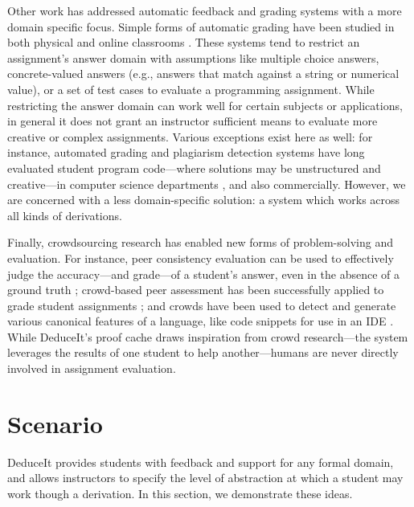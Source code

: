 \documentclass{sigchi}
\begin{document}
Other work has addressed automatic feedback and grading systems with a more domain specific focus. Simple forms of automatic grading have been studied in both physical and online classrooms \cite{auto-grade}. These systems tend to restrict an assignment's answer domain with assumptions like multiple choice answers, concrete-valued answers (e.g., answers that match against a string or numerical value), or a set of test cases to evaluate a programming assignment. While restricting the answer domain can work well for certain subjects or applications, in general it does not grant an instructor sufficient means to evaluate more creative or complex assignments. Various exceptions exist here as well: for instance, automated grading and plagiarism detection systems have long evaluated student program code---where solutions may be unstructured and creative---in computer science departments \cite{grade-programs, moss}, and also commercially. However, we are concerned with a less domain-specific solution: a system which works across all kinds of derivations.

Finally, crowdsourcing research has enabled new forms of problem-solving and evaluation. For instance, peer consistency evaluation can be used to effectively judge the accuracy---and grade---of a student's answer, even in the absence of a ground truth \cite{peer-consistency}; crowd-based peer assessment has been successfully applied to grade student assignments \cite{peer-assessment, chinmay-srk}; and crowds have been used to detect and generate various canonical features of a language, like code snippets for use in an IDE \cite{crowd-snippets}. While DeduceIt's proof cache draws inspiration from crowd research---the system leverages the results of one student to help another---humans are never directly involved in assignment evaluation. %

\section{Scenario}
DeduceIt provides students with feedback and support for any formal domain, and allows instructors to specify the level of abstraction at which a student may work though a derivation. In this section, we demonstrate these ideas. 
\end{document}

